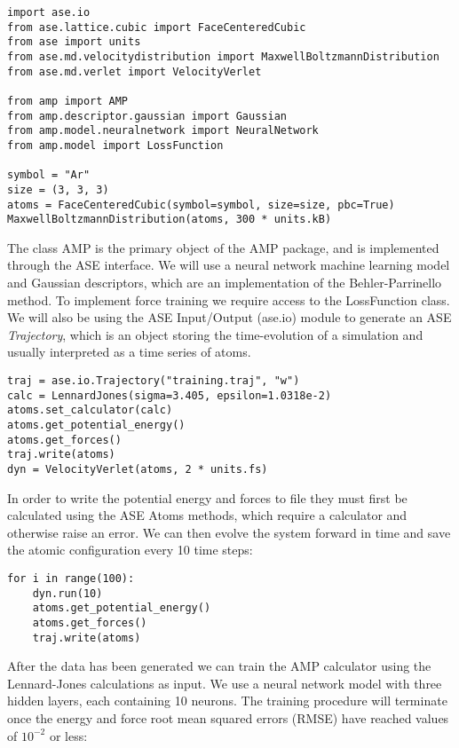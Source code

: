 \begin{verbatim}
import ase.io
from ase.lattice.cubic import FaceCenteredCubic
from ase import units
from ase.md.velocitydistribution import MaxwellBoltzmannDistribution
from ase.md.verlet import VelocityVerlet

from amp import AMP
from amp.descriptor.gaussian import Gaussian
from amp.model.neuralnetwork import NeuralNetwork
from amp.model import LossFunction

symbol = "Ar"
size = (3, 3, 3)
atoms = FaceCenteredCubic(symbol=symbol, size=size, pbc=True)
MaxwellBoltzmannDistribution(atoms, 300 * units.kB)
\end{verbatim}

The class AMP is the primary object of the AMP package,
and is implemented through the ASE interface.
We will use a neural network machine learning model
and Gaussian descriptors, which are an implementation of the
Behler-Parrinello method. To implement force training we require
access to the LossFunction class.
We will also be using the ASE Input/Output (ase.io) module to generate an
ASE \textit{Trajectory}, which is an object
storing the time-evolution of a simulation and usually interpreted
as a time series of atoms.

\begin{verbatim}
traj = ase.io.Trajectory("training.traj", "w")
calc = LennardJones(sigma=3.405, epsilon=1.0318e-2)
atoms.set_calculator(calc)
atoms.get_potential_energy()
atoms.get_forces()
traj.write(atoms)
dyn = VelocityVerlet(atoms, 2 * units.fs)
\end{verbatim}

In order to write the potential energy and forces to file
they must first be calculated using the ASE Atoms methods,
which require a calculator and otherwise raise an error.
We can then evolve the system forward in time
and save the atomic configuration every 10 time steps:

\begin{verbatim}
for i in range(100):
    dyn.run(10)
    atoms.get_potential_energy()
    atoms.get_forces()
    traj.write(atoms)
\end{verbatim}

After the data has been generated we can train the AMP calculator
using the Lennard-Jones calculations as input. 
We use a neural network model with three hidden layers,
each containing 10 neurons.
The training procedure
will terminate once the energy and force root mean squared errors (RMSE)
have reached values of $10^{-2}$ or less:


